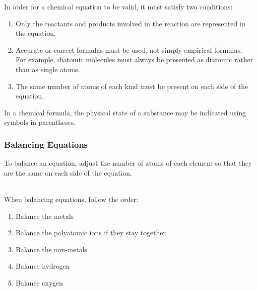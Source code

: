 \begin{example}
\end{example}

\noindent
In order for a chemical equation to be valid, it must satisfy two conditions:

\begin{enumerate}
\item Only the reactants and products involved in the reaction are represented in the equation.
\item Accurate or correct formulas must be used, not simply empirical formulas. For example, diatomic molecules must always be presented as diatomic rather than as single atoms.
\item The same number of atoms of each kind must be present on each side of the equation.
\end{enumerate}

\noindent
In a chemical formula, the physical state of a substance may be indicated using symbols in parentheses.

\begin{example}
\end{example}


\subsubsection{Balancing Equations}

To balance an equation, adjust the number of atoms of each element so that they are the same on each side of the equation. \\

\noindent
{} \\

\noindent
{}

\noindent
When balancing equations, follow the order:

\begin{enumerate}
\item Balance the metals
\item Balance the polyatomic ions if they stay together
\item Balance the non-metals
\item Balance hydrogen
\item Balance oxygen
\end{enumerate}

